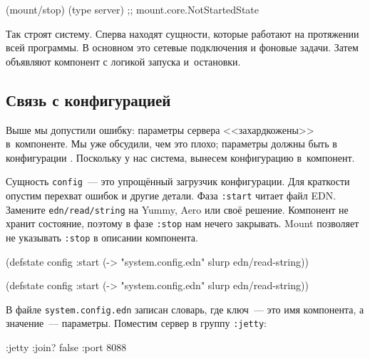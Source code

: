 \begin{english}
  \begin{clojure}
(mount/stop)
(type server)
;; mount.core.NotStartedState
  \end{clojure}
\end{english}

Так строят систему. Сперва находят сущности, которые работают на протяжении всей
программы. В основном это сетевые подключения и фоновые задачи. Затем объявляют
компонент с логикой запуска и~остановки.

\subsection{Связь с конфигурацией}

Выше мы допустили ошибку: параметры сервера <<захардкожены>> в~компоненте. Мы
уже обсудили, чем это плохо; параметры должны быть в
конфигурации . Поскольку у нас система, вынесем конфигурацию
в~компонент.


Сущность \verb|config|~--- это упрощённый загрузчик конфигурации. Для краткости
опустим перехват ошибок и другие детали. Фаза \verb|:start| читает файл
EDN. Замените \texttt{edn/read\-/string} на Yummy, Aero или своё
решение. Компонент не хранит состояние, поэтому в фазе \verb|:stop| нам нечего
закрывать. Mount позволяет не указывать \verb|:stop| в описании компонента.

\ifnarrow

\begin{english}
  \begin{clojure}
(defstate config
  :start
  (-> "system.config.edn"
      slurp
      edn/read-string))
  \end{clojure}
\end{english}

\else

\begin{english}
  \begin{clojure}
(defstate config
  :start
  (-> "system.config.edn" slurp edn/read-string))
  \end{clojure}
\end{english}

\fi

В файле \verb|system.config.edn| записан словарь, где ключ~--- это имя компонента, а
значение~--- параметры. Поместим сервер в группу \verb|:jetty|:

\begin{english}
  \begin{clojure}
{:jetty {:join? false :port 8088}}
  \end{clojure}
\end{english}

